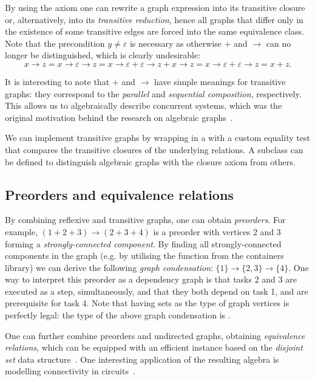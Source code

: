 By using the axiom one can rewrite a graph expression into its transitive closure or,
alternatively, into its \emph{transitive reduction}, hence all graphs that differ only in the
existence of some transitive edges are forced into the same equivalence class. Note that the
precondition $y \neq \varepsilon$ is necessary as otherwise $+$ and $\rightarrow$ can no
longer be distinguished, which is clearly undesirable:
\[
x\!\rightarrow\!z = x\!\rightarrow\!\varepsilon\!\rightarrow z = x\!\rightarrow\!\varepsilon
 + \varepsilon\!\rightarrow\!z + x\!\rightarrow\!z = x\!\rightarrow\!\varepsilon
 + \varepsilon\!\rightarrow\!z = x + z.
\]

It is interesting to note that $+$ and $\rightarrow$ have simple meanings for transitive
graphs: they correspond to the \emph{parallel} and \emph{sequential composition},
respectively. This allows us to algebraically describe concurrent systems, which was
the original motivation behind the research on algebraic graphs~\cite{2014_algebra_mokhov}.

We can implement transitive graphs by wrapping
 in a  with a custom equality test that
compares the transitive closures of the underlying relations.
A subclass  can be
defined to distinguish algebraic graphs with the closure axiom from others.

\subsection{Preorders and equivalence relations}\label{sub-preorder}

By combining reflexive and transitive graphs, one can obtain \emph{preorders}.
For example, $(1 + 2 + 3) \rightarrow (2 + 3 + 4)$
is a preorder with vertices 2 and 3 forming a \emph{strongly-connected component}. By
finding all strongly-connected components in the graph (e.g. by utilising the
function  from the \textsf{containers} library) we can derive the
following \emph{graph condensation}:
$\{1\} \rightarrow \{2, 3\} \rightarrow \{4\}$. One way to interpret this preorder as a
dependency graph is that tasks 2 and 3 are executed as a step, simultaneously,
and that they both depend on task 1, and are prerequisite for task 4. Note that
having sets as the type of graph vertices is perfectly legal: the type of the
above graph condensation is .

One can further combine preorders and undirected graphs, obtaining \emph{equivalence
relations}, which can be equipped with an efficient instance based on the
\emph{disjoint set} data structure~\cite{1984_set_union_tarjan}. One interesting
application of the resulting algebra is modelling connectivity in
circuits~\cite{2015_mokhov_algebra}.

